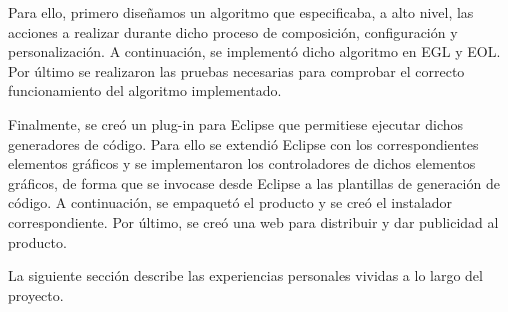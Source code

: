 Para ello, primero diseñamos un algoritmo que especificaba, a alto nivel, las acciones a realizar durante dicho proceso de composición, configuración y personalización. A continuación, se implementó dicho algoritmo en EGL y EOL. Por último se realizaron las pruebas necesarias para comprobar el correcto funcionamiento del algoritmo implementado.

Finalmente, se creó un plug-in para Eclipse que permitiese ejecutar dichos generadores de código. Para ello se extendió Eclipse con los correspondientes elementos gráficos y se implementaron los controladores de dichos elementos gráficos, de forma que se invocase desde Eclipse a las plantillas de generación de código. A continuación, se empaquetó el producto y se creó el instalador correspondiente. Por último, se creó una web para distribuir y dar publicidad al producto.

La siguiente sección describe las experiencias personales vividas a lo largo del proyecto.












